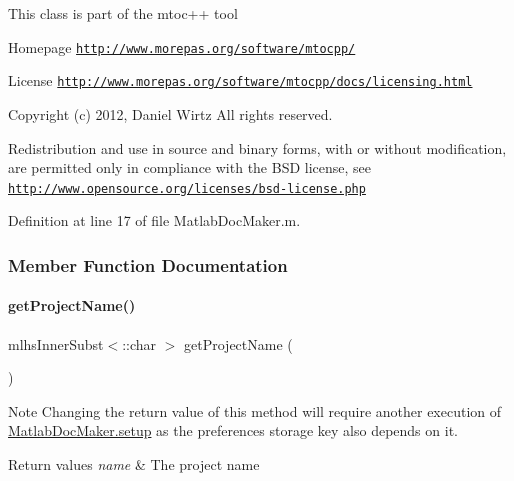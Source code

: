 This class is part of the mtoc++ tool
\begin{DoxyItemize}
\item {\ttfamily Homepage} \href{http://www.morepas.org/software/mtocpp/}{\tt http\+://www.\+morepas.\+org/software/mtocpp/}
\item {\ttfamily License} \href{http://www.morepas.org/software/mtocpp/docs/licensing.html}{\tt http\+://www.\+morepas.\+org/software/mtocpp/docs/licensing.\+html}
\end{DoxyItemize}

Copyright (c) 2012, Daniel Wirtz All rights reserved.

Redistribution and use in source and binary forms, with or without modification, are permitted only in compliance with the B\+SD license, see \href{http://www.opensource.org/licenses/bsd-license.php}{\tt http\+://www.\+opensource.\+org/licenses/bsd-\/license.\+php} 

Definition at line 17 of file Matlab\+Doc\+Maker.\+m.



\subsubsection{Member Function Documentation}
\mbox{\label{class_matlab_doc_maker_af8bd1d74d403b7e81831a0b0f7351e72}} 
\paragraph{\texorpdfstring{get\+Project\+Name()}{getProjectName()}}
{\footnotesize\ttfamily mlhs\+Inner\+Subst$<$\+::char $>$ get\+Project\+Name (\begin{DoxyParamCaption}{ }\end{DoxyParamCaption})\hspace{0.3cm}{\ttfamily [static]}}

\begin{DoxyNote}{Note}
Changing the return value of this method will require another execution of \hyperlink{class_matlab_doc_maker_a4ea0d0f724d201bba3448cc579624e35}{Matlab\+Doc\+Maker.\+setup} as the preferences storage key also depends on it.
\end{DoxyNote}

\begin{DoxyRetVals}{Return values}
{\em name} & The project name \\
\hline
\end{DoxyRetVals}


